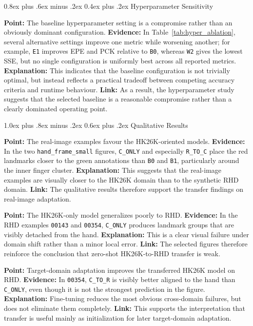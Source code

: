 \documentclass[10pt,letterpaper]{article}
\makeatletter
\renewcommand\subsection{\@startsection{subsection}{2}{\z@}%
  {1.0ex plus .8ex minus .2ex}%
  {0.6ex plus .2ex}%
  {\normalfont\itshape}}
\renewcommand\subsubsection{\@startsection{subsubsection}{3}{\z@}%
  {0.8ex plus .6ex minus .2ex}%
  {0.4ex plus .2ex}%
  {\normalfont\small\itshape}}
\makeatother
\begin{document}
\subsubsection{Hyperparameter Sensitivity}

\medskip
\noindent\textbf{Point:} The baseline hyperparameter setting is a compromise rather than an obviously dominant configuration.  
\textbf{Evidence:} In Table~\ref{tab:hyper_ablation}, several alternative settings improve one metric while worsening another; for example, \texttt{E1} improves EPE and PCK relative to \texttt{B0}, whereas \texttt{W2} gives the lowest SSE, but no single configuration is uniformly best across all reported metrics.  
\textbf{Explanation:} This indicates that the baseline configuration is not trivially optimal, but instead reflects a practical tradeoff between competing accuracy criteria and runtime behaviour.  
\textbf{Link:} As a result, the hyperparameter study suggests that the selected baseline is a reasonable compromise rather than a clearly dominated operating point.

\subsection{Qualitative Results}

\medskip
\noindent\textbf{Point:} The real-image examples favour the HK26K-oriented models.  
\textbf{Evidence:} In the two \texttt{hand\_frame\_small} figures, \texttt{C\_ONLY} and especially \texttt{R\_TO\_C} place the red landmarks closer to the green annotations than \texttt{B0} and \texttt{B1}, particularly around the inner finger cluster.  
\textbf{Explanation:} This suggests that the real-image examples are visually closer to the HK26K domain than to the synthetic RHD domain.  
\textbf{Link:} The qualitative results therefore support the transfer findings on real-image adaptation.

\medskip
\noindent\textbf{Point:} The HK26K-only model generalizes poorly to RHD.  
\textbf{Evidence:} In the RHD examples \texttt{00143} and \texttt{00354}, \texttt{C\_ONLY} produces landmark groups that are visibly detached from the hand.  
\textbf{Explanation:} This is a clear visual failure under domain shift rather than a minor local error.  
\textbf{Link:} The selected figures therefore reinforce the conclusion that zero-shot HK26K-to-RHD transfer is weak.

\medskip
\noindent\textbf{Point:} Target-domain adaptation improves the transferred HK26K model on RHD.  
\textbf{Evidence:} In \texttt{00354}, \texttt{C\_TO\_R} is visibly better aligned to the hand than \texttt{C\_ONLY}, even though it is not the strongest prediction in the figure.  
\textbf{Explanation:} Fine-tuning reduces the most obvious cross-domain failures, but does not eliminate them completely.  
\textbf{Link:} This supports the interpretation that transfer is useful mainly as initialization for later target-domain adaptation.
\end{document}
